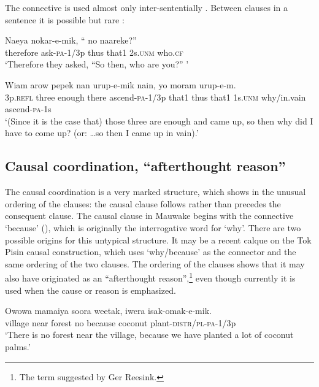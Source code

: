The connective  is used almost only inter-sententially . Between clauses in a sentence it is possible but rare :

\ea%
\label{ex:8:x1905}
\gll Naeya  nokar-e-mik, ``    no  naareke?'' \\
therefore  ask-\textsc{pa}-1/3p  thus  that1  2s.\textsc{unm}  who.\textsc{cf}\\
\glt`Therefore they asked, ``So then, who are you?'' '
\z


\ea%
\label{ex:8:x1424}
\gll Wiam  arow  pepek  nan  urup-e-mik  nain,     yo  moram  urup-e-m. \\
3p.\textsc{refl} three  enough  there  ascend-\textsc{pa}-1/3p  that1 thus  that1  1s.\textsc{unm} why/in.vain ascend-\textsc{pa}-1s    \\
\glt`(Since it is the case that) those three are enough and came up, so then why did I have to come up? (or: {\dots}so then I came up in vain).'
\z


\subsection{Causal coordination, ``afterthought reason''}

The causal coordination is a very marked structure, which shows in the unusual ordering of the clauses: the causal clause follows rather than precedes the consequent clause. The causal clause in Mauwake begins with the connective  `because' (), which is originally the interrogative word for `why'.  There are two possible origins for this untypical structure. It may be a recent calque on the Tok Pisin causal construction, which uses  `why/because' as the connector and the same ordering of the two clauses. The ordering of the clauses shows that it may also have originated as an ``afterthought reason'',\footnote{The term suggested by Ger Reesink.} even though  currently it is used when the cause or reason is emphasized. 

\ea%
\label{ex:8:x1417}
\gll Owowa  mamaiya  soora  weetak,    iwera isak-omak-e-mik.\\
village  near  forest  no  because  coconut plant-\textsc{distr}/\textsc{pl}-\textsc{pa}-1/3p\\
\glt`There is no forest near the village, because we have planted a lot of coconut palms.'
\z


